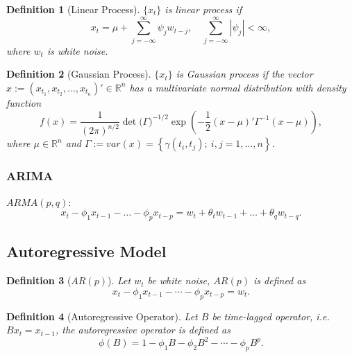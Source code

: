 \documentclass[10pt]{article}
\theoremstyle{remark}
\theoremstyle{plain}
\newtheorem{Definition}{Definition}[section]
\newcommand{\R}{\mathbb{R}}
\numberwithin{equation}{section}
\begin{document}
\begin{Definition}[Linear Process]
	$\{x_t\}$ is linear process if 
	\[
	x_t = \mu + \sum_{j=-\infty}^\infty \psi_j w_{t-j}, \quad \sum_{j=-\infty}^\infty |\psi_j|< \infty,
	\]
	where $w_t$ is white noise.
\end{Definition}

\begin{Definition}[Gaussian Process]
	$\{x_t\}$ is Gaussian process if the vector $x := (x_{t_1}, x_{t_2},\dots, x_{t_n})' \in \R^n$ has a multivariate normal distribution with density function
	\[
	f(x) = \frac{1}{(2\pi)^{n/2}} \det\big(\Gamma\big)^{-1/2} \exp \left(-\frac{1}{2} (x-\mu)' \Gamma^{-1} (x-\mu) \right),
	\]
	where $\mu \in \R^n$ and $\Gamma:= var (x) = \left\{ \gamma(t_i, t_j);\ i,j=1,\dots,n\right\}$.
\end{Definition}

\subsubsection{ARIMA}
$ARMA(p,q)$: 
\[
x_t - \phi_1 x_{t-1} - \dots - \phi_p x_{t-p} = w_t + \theta_t w_{t-1} + \dots + \theta_q w_{t-q}.
\]

\subsection{Autoregressive Model}

\begin{Definition}[$AR(p)$]
	Let $w_t$ be white noise, $AR(p)$ is defined as 
	\[
	x_t - \phi_1 x_{t-1} - \cdots - \phi_p x_{t-p} = w_t.
	\]
\end{Definition}

\begin{Definition}[Autoregressive Operator]
	Let $B$ be time-lagged operator, i.e. $Bx_t = x_{t-1}$, the autoregressive operator is defined as
	\[
	\phi(B) = 1-\phi_1 B - \phi_2 B^2 - \cdots - \phi_p B^p.
	\]
\end{Definition}
\end{document}
